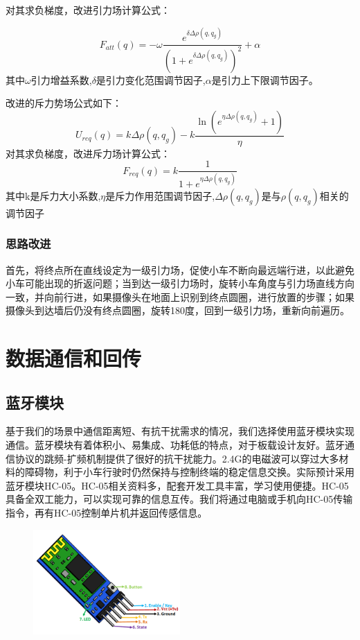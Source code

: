 \documentclass{report}
\begin{document}
对其求负梯度，改进引力场计算公式：

\[ F_{att}(q)=-\omega\frac{e^{\delta\Delta\rho(q,q_g)}}{\left(1+e^{\delta\Delta\rho(q,q_g)}\right)^2}+\alpha  \]
其中$\omega$引力增益系数,$\delta$是引力变化范围调节因子,$\alpha$是引力上下限调节因子。

改进的斥力势场公式如下：
\[ U_{req}(q)=k\Delta\rho(q,q_g)-k\frac{\ln{(e^{\eta\Delta\rho(q,q_g)}+1)}}{\eta} \]
对其求负梯度，改进斥力场计算公式：
\[ F_{req}(q)=k\frac1{1+e^{\eta\Delta\rho(q,q_g)}} \]
其中k是斥力大小系数,$\eta$是斥力作用范围调节因子,$\Delta\rho(q,q_{g})$是与$\rho(q,q_{g})$相关的调节因子
\subsubsection{思路改进}
\label{subsec:label}
首先，将终点所在直线设定为一级引力场，促使小车不断向最远端行进，以此避免小车可能出现的折返问题；当到达一级引力场时，旋转小车角度与引力场直线方向一致，并向前行进，如果摄像头在地面上识别到终点圆圈，进行放置的步骤；如果摄像头到达墙后仍没有终点圆圈，旋转180度，回到一级引力场，重新向前遍历。

\section{数据通信和回传}
\label{sec:label}
\subsection{蓝牙模块}
\label{subsec:label}
基于我们的场景中通信距离短、有抗干扰需求的情况，我们选择使用蓝牙模块实现通信。蓝牙模块有着体积小、易集成、功耗低的特点，对于板载设计友好。蓝牙通信协议的跳频-扩频机制提供了很好的抗干扰能力。2.4G的电磁波可以穿过大多材料的障碍物，利于小车行驶时仍然保持与控制终端的稳定信息交换。实际预计采用蓝牙模块HC-05。HC-05相关资料多，配套开发工具丰富，学习使用便捷。HC-05具备全双工能力，可以实现可靠的信息互传。我们将通过电脑或手机向HC-05传输指令，再有HC-05控制单片机并返回传感信息。
\begin{figure}[ht]
  \centering
  \includegraphics[width=0.5\textwidth]{figures/hc-05.png}
  \caption{\label{fig:label} }
\end{figure}
\newpage
\end{document}
